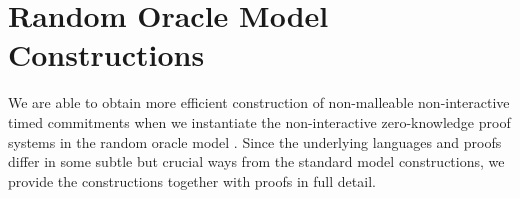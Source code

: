 \section{Random Oracle Model Constructions}
We are able to obtain more efficient construction of non-malleable non-interactive timed commitments when we instantiate the non-interactive zero-knowledge proof systems in the random oracle model \cite{CCS:BelRog93}. Since the underlying languages and proofs differ in some subtle but crucial ways from the standard model constructions, we provide the constructions together with proofs in full detail.




